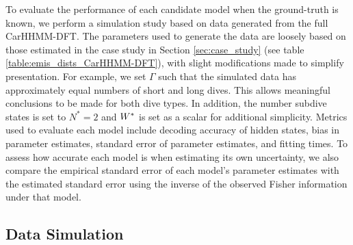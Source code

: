 

To evaluate the performance of each candidate model when the ground-truth is known, we perform a simulation study based on data generated from the full CarHHMM-DFT. The parameters used to generate the data are loosely based on those estimated in the case study in Section \ref{sec:case_study} (see table \ref{table:emis_dists_CarHHMM-DFT}), with slight modifications made to simplify presentation. For example, we set $\Gamma$ such that the simulated data has approximately equal numbers of short and long dives. This allows meaningful conclusions to be made for both dive types. In addition, the number subdive states is set to $N^*=2$ and $W^*$ is set as a scalar for additional simplicity. Metrics used to evaluate each model include decoding accuracy of hidden states, bias in parameter estimates, standard error of parameter estimates, and fitting times. To assess how accurate each model is when estimating its own uncertainty, we also compare the empirical standard error of each model's parameter estimates with the estimated standard error using the inverse of the observed Fisher information under that model.

\subsection{Data Simulation}

